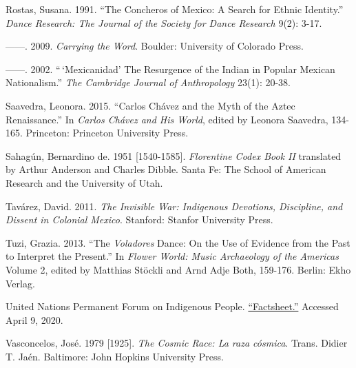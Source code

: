 \documentclass{scrartcl}
\begin{document}
 Rostas, Susana. 1991. ``The Concheros of Mexico: A Search for
Ethnic Identity.'' \emph{Dance Research: The Journal of the Society for
Dance Research} 9(2): 3-17.

 ­­­------. 2009. \emph{Carrying the Word}. Boulder:
University of Colorado Press.

 ­­­------. 2002. ``\,`Mexicanidad' The Resurgence of the
Indian in Popular Mexican Nationalism.'' \emph{The Cambridge Journal of
Anthropology} 23(1): 20-38.

 Saavedra, Leonora. 2015. ``Carlos Chávez and the Myth of the
Aztec Renaissance.'' In \emph{Carlos Chávez and His World}, edited by
Leonora Saavedra, 134-165. Princeton: Princeton University Press.

 Sahagún, Bernardino de. 1951 {[}1540-1585{]}.
\emph{Florentine Codex Book II} translated by Arthur Anderson and
Charles Dibble. Santa Fe: The School of American Research and the
University of Utah.

 Tavárez, David. 2011. \emph{The Invisible War: Indigenous
Devotions, Discipline, and Dissent in Colonial Mexico}. Stanford:
Stanfor University Press.

 Tuzi, Grazia. 2013. ``The \emph{Voladores} Dance: On the Use
of Evidence from the Past to Interpret the Present.'' In \emph{Flower
World: Music Archaeology of the Americas} Volume 2, edited by Matthias
Stöckli and Arnd Adje Both, 159-176. Berlin: Ekho Verlag.

 United Nations Permanent Forum on Indigenous People.
\href{https://www.un.org/esa/socdev/unpfii/documents/5session_factsheet1.pdf}{``Factsheet.''}
Accessed April 9, 2020.

 Vasconcelos, José. 1979 {[}1925{]}. \emph{The Cosmic Race: La
raza cósmica}. Trans. Didier T. Jaén. Baltimore: John Hopkins University
Press.
\end{document}
